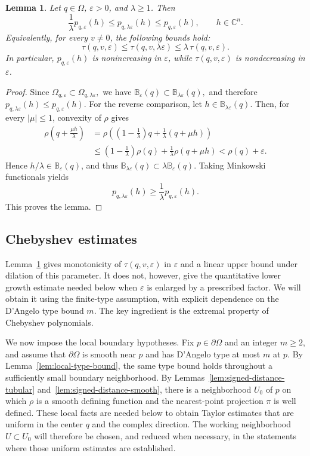 \documentclass[11pt]{article}
\newtheorem{lemma}[theorem]{Lemma}
\theoremstyle{definition}
\newcommand{\C}{\mathbb{C}}
\newcommand{\eps}{\varepsilon}
\begin{document}
\begin{lemma}\label{lem:p-scale}
	Let \(q\in\Omega\), \(\eps>0\), and \(\lambda\ge1\).  Then
	\[
	\frac1\lambda p_{q,\eps}(h)
	\le
	p_{q,\lambda\eps}(h)
	\le
	p_{q,\eps}(h),
	\qquad h\in\C^n.
	\]
	Equivalently, for every \(v\ne0\), the following bounds hold:
	\[
	\tau(q,v,\eps)
	\le
	\tau(q,v,\lambda\eps)
	\le
	\lambda\,\tau(q,v,\eps).
	\]
	In particular, \(p_{q,\eps}(h)\) is nonincreasing in \(\eps\), while
	\(\tau(q,v,\eps)\) is nondecreasing in \(\eps\).
\end{lemma}
\begin{proof}
	Since
	\(
	\Omega_{q,\eps}\subset\Omega_{q,\lambda\eps},
	\)
	we have
\(	
	\mathbb B_\eps(q)\subset\mathbb B_{\lambda\eps}(q),
\)
	and therefore
	\(p_{q,\lambda\eps}(h)\le p_{q,\eps}(h)\).
	For the reverse comparison, let
	\(h\in\mathbb B_{\lambda\eps}(q)\). Then, for every \(|\mu|\le1\),
	convexity of \(\rho\) gives
	\[
	\begin{aligned}
		\rho\left(q+\frac{\mu h}{\lambda}\right)
		&=
		\rho\left(
		\left(1-\frac1\lambda\right)q
		+\frac1\lambda(q+\mu h)
		\right)\\
		&\le
		\left(1-\frac1\lambda\right)\rho(q)
		+\frac1\lambda\rho(q+\mu h)
		<\rho(q)+\eps.
	\end{aligned}
	\]
	Hence \(h/\lambda\in\mathbb B_\eps(q)\), and thus
	\(
	\mathbb B_{\lambda\eps}(q)
	\subset
	\lambda\mathbb B_\eps(q).
	\)
	Taking Minkowski functionals yields
	\[
	p_{q,\lambda\eps}(h)
	\ge
	\frac1\lambda p_{q,\eps}(h).
	\]
	This proves the lemma.
\end{proof}

\subsection{Chebyshev estimates}
\label{subsec:finite-type-scales}
Lemma~\ref{lem:p-scale} gives monotonicity of \(\tau(q,v,\eps)\) in
\(\eps\) and a linear upper bound under dilation of this parameter.
It does not, however, give the quantitative lower growth estimate
needed below when \(\eps\) is enlarged by a prescribed factor.  We will obtain it using the finite-type assumption,
with explicit dependence on the D'Angelo type bound \(m\).  The key ingredient is the
extremal property of Chebyshev polynomials.

We now impose the local boundary hypotheses.  Fix
\(p\in\partial\Omega\) and an integer \(m\ge2\), and assume that
\(\partial\Omega\) is smooth near \(p\) and has D'Angelo type at most
\(m\) at \(p\). By Lemma~\ref{lem:local-type-bound}, the same type
bound holds throughout a sufficiently small boundary neighborhood. By
Lemmas~\ref{lem:signed-distance-tubular}
and~\ref{lem:signed-distance-smooth}, there is a neighborhood \(U_0\) of
\(p\) on which \(\rho\) is a smooth defining function and the
nearest-point projection \(\pi\) is well defined.  These local facts are
needed below to obtain Taylor estimates that are uniform in the center
\(q\) and the complex direction.  The working neighborhood \(U\subset U_0\)
will therefore be chosen, and reduced when necessary, in the statements
where those uniform estimates are established.
\end{document}
